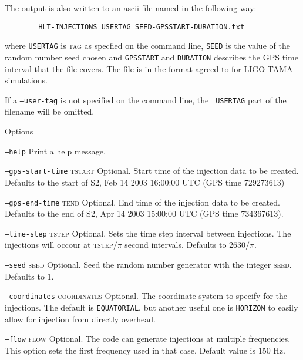 \begin{entry}
The output is also written to an ascii file named in the following way:
\begin{center}
\begin{verbatim}
        HLT-INJECTIONS_USERTAG_SEED-GPSSTART-DURATION.txt
\end{verbatim}
\end{center}
where \verb$USERTAG$ is \textsc{tag} as specfied on the command line, 
\verb$SEED$ is the  value  of  the random number seed chosen and 
\verb$GPSSTART$ and \verb$DURATION$ describes the GPS time interval that
the file covers. The file is in the format agreed to for LIGO-TAMA
simulations.  

If a \texttt{--user-tag} is not specified on the command line, the
\texttt{\_USERTAG} part of the filename will be omitted.

\item[Options]\leavevmode
\begin{entry}
\item[\texttt{--help}] Print a help message.

\item[\texttt{--gps-start-time} \textsc{tstart}]
Optional.  Start time of the injection data to be created. Defaults to the
start of S2, Feb 14 2003 16:00:00 UTC (GPS time 729273613)

\item[\texttt{--gps-end-time} \textsc{tend}]
Optional. End time of the injection data to be created. Defaults to the end of
S2, Apr 14 2003 15:00:00 UTC (GPS time 734367613).

\item[\texttt{--time-step} \textsc{tstep}]
Optional. Sets the time step interval between injections. The injections will
occour at \textsc{tstep}$/\pi$ second intervals. Defaults to $2630/\pi$.

\item[\texttt{--seed} \textsc{seed}]
Optional. Seed the random number generator with the integer \textsc{seed}.
Defaults to $1$.

\item[\texttt{--coordinates} \textsc{coordinates}] 
Optional.  The coordinate system to specify for the injections.  The
default is \verb+EQUATORIAL+,   but another useful one is
\verb+HORIZON+ to easily allow for injection from directly overhead.

\item[\texttt{--flow} \textsc{flow}]
Optional.  The code can generate injections at multiple frequencies.
This option sets the first frequency used in that case.  Default value
is 150 Hz.


\end{entry}
\end{entry}
